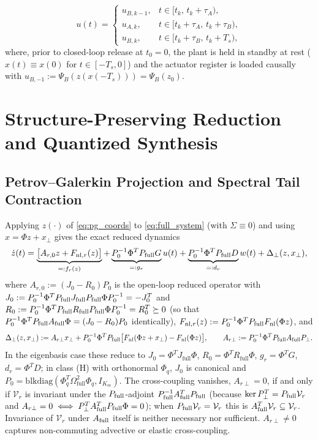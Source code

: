 \begin{enumerate}
    \begin{equation}
    \label{eq:multirate_hold}
    u(t) = \begin{cases}
    u_{B,k-1}, & t \in [t_k,\, t_k + \tau_A), \\
    u_{A,k},   & t \in [t_k + \tau_A,\, t_k + \tau_B), \\
    u_{B,k},   & t \in [t_k + \tau_B,\, t_k + T_s),
    \end{cases}
    \end{equation}
    where, prior to closed-loop release at \(t_0 = 0\), the plant is held in standby at rest (\(x(t) \equiv x(0)\) for \(t \in [-T_s, 0]\)) and the actuator register is loaded causally with \(u_{B,-1} := \Psi_B(z(x(-T_s))) = \Psi_B(z_0)\).
\end{enumerate}

\section{Structure-Preserving Reduction and Quantized Synthesis}
\label{sec:methodology}

\subsection{Petrov--Galerkin Projection and Spectral Tail Contraction}
Applying \(z(\cdot)\) of \eqref{eq:pg_coords} to \eqref{eq:full_system} (with \(\Sigma \equiv 0\)) and using \(x = \Phi z + x_\perp\) gives the exact reduced dynamics
\begin{equation}
\label{eq:reduced_dynamics}
\dot{z}(t) = \underbrace{\big[A_{r,0} z + F_{\mathrm{nl},r}(z)\big]}_{=: f_r(z)} + \underbrace{P_0^{-1}\Phi^T P_{\mathrm{full}} G}_{=: g_r} u(t) + \underbrace{P_0^{-1}\Phi^T P_{\mathrm{full}} D}_{=: d_r} w(t) + \Delta_\perp(z, x_\perp),
\end{equation}
where \(A_{r,0} := (J_0 - R_0)P_0\) is the open-loop reduced operator with
\(J_0 := P_0^{-1}\Phi^TP_{\mathrm{full}} J_{\mathrm{full}}P_{\mathrm{full}}\Phi P_0^{-1} = -J_0^T\) and \(R_0 := P_0^{-1}\Phi^TP_{\mathrm{full}} R_{\mathrm{full}}P_{\mathrm{full}}\Phi P_0^{-1} = R_0^T \succeq 0\) (so that \(P_0^{-1}\Phi^TP_{\mathrm{full}}A_{\mathrm{full}}\Phi = (J_0 - R_0)P_0\) identically), \(F_{\mathrm{nl},r}(z) := P_0^{-1}\Phi^TP_{\mathrm{full}} F_{\mathrm{nl}}(\Phi z)\), and
\[
\Delta_\perp(z, x_\perp) := A_{r\perp} x_\perp + P_0^{-1}\Phi^TP_{\mathrm{full}}\big[F_{\mathrm{nl}}(\Phi z + x_\perp) - F_{\mathrm{nl}}(\Phi z)\big], \qquad A_{r\perp} := P_0^{-1}\Phi^T P_{\mathrm{full}} A_{\mathrm{full}} P_\perp .
\]
In the eigenbasis case these reduce to \(J_0 = \Phi^T J_{\mathrm{full}}\Phi\), \(R_0 = \Phi^T R_{\mathrm{full}}\Phi\), \(g_r = \Phi^T G\), \(d_r = \Phi^TD\); in class (H) with orthonormal \(\Phi_q\), \(J_0\) is canonical and \(P_0 = \mathrm{blkdiag}(\Phi_q^T\Omega_{\mathrm{full}}^2\Phi_q, I_{K_m})\). The cross-coupling vanishes, \(A_{r\perp} = 0\), if and only if \(\mathcal{V}_r\) is invariant under the \(P_{\mathrm{full}}\)-adjoint \(P_{\mathrm{full}}^{-1}A_{\mathrm{full}}^TP_{\mathrm{full}}\) (because \(\ker P_\perp^T = P_{\mathrm{full}}\mathcal{V}_r\) and \(A_{r\perp} = 0 \iff P_\perp^TA_{\mathrm{full}}^TP_{\mathrm{full}}\Phi = 0\)); when \(P_{\mathrm{full}}\mathcal{V}_r = \mathcal{V}_r\) this is \(A_{\mathrm{full}}^T\mathcal{V}_r \subseteq \mathcal{V}_r\). Invariance of \(\mathcal{V}_r\) under \(A_{\mathrm{full}}\) itself is neither necessary nor sufficient. \(A_{r\perp} \neq 0\) captures non-commuting advective or elastic cross-coupling.

